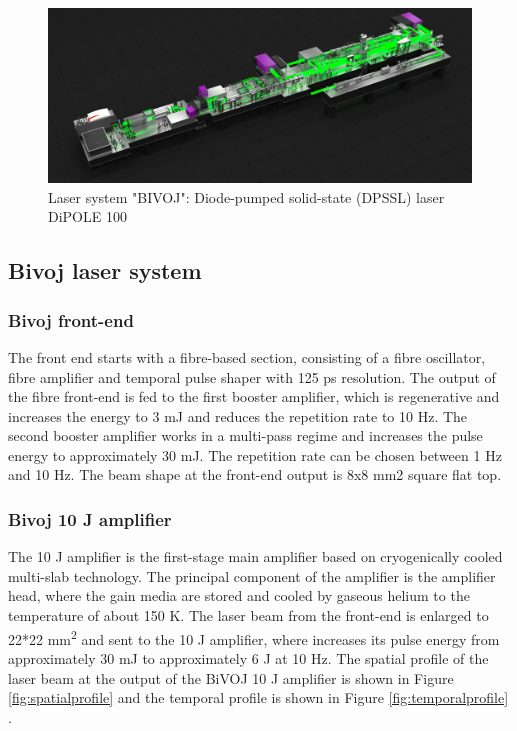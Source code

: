 \begin{figure}[h]
    \centering
    \includegraphics[width=1.0\linewidth]{img/bivoj.jpg}
    \caption{Laser system "BIVOJ": Diode-pumped solid-state (DPSSL) laser DiPOLE 100}
    \label{fig:bivoj}
\end{figure}

\subsection{Bivoj laser system}

\subsubsection*{Bivoj front-end}

The front end starts with a fibre-based section, consisting
of a fibre oscillator, fibre amplifier and temporal pulse shaper
with 125 ps resolution. The output of the fibre front-end is fed
to the first booster amplifier, which is regenerative and
increases the energy to 3 mJ and reduces the repetition rate to 10
Hz. The second booster amplifier works in a multi-pass regime
and increases the pulse energy to approximately 30 mJ.
The repetition rate can be chosen between 1 Hz and 10 Hz. The
beam shape at the front-end output is 8x8 mm2 square flat top.

\subsubsection*{Bivoj 10 J amplifier}

The 10 J amplifier is the first-stage main amplifier based on
cryogenically cooled multi-slab technology. The principal
component of the amplifier is the amplifier head, where the
gain media are stored and cooled by gaseous helium to 
the temperature of about 150 K. The laser beam from the front-end
is enlarged to 22*22 mm\textsuperscript{2} and sent to the 10 J amplifier, where
increases its pulse energy from approximately 30 mJ to
approximately 6 J at 10 Hz. The spatial profile of the laser beam at the output of the BiVOJ 10 J amplifier is shown in Figure \ref{fig:spatialprofile} and the temporal profile is shown in Figure \ref{fig:temporalprofile} \cite{saumyabrata}.

